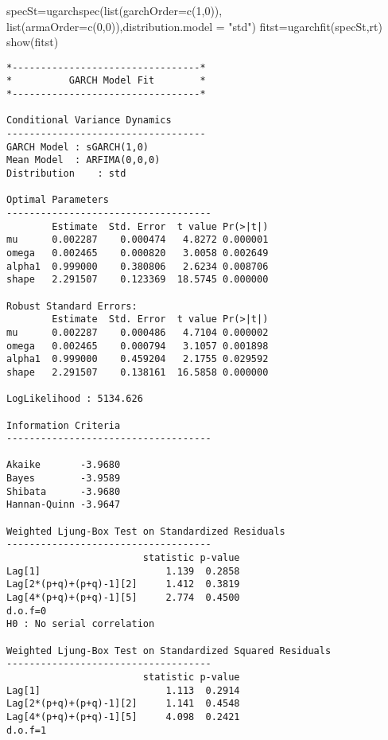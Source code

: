 \documentclass[
  ignorenonframetext,
]{beamer}
\newenvironment{Shaded}{\begin{snugshade}}{\end{snugshade}}
\newcommand{\AttributeTok}[1]{\textcolor[rgb]{0.77,0.63,0.00}{#1}}
\newcommand{\DecValTok}[1]{\textcolor[rgb]{0.00,0.00,0.81}{#1}}
\newcommand{\FunctionTok}[1]{\textcolor[rgb]{0.00,0.00,0.00}{#1}}
\newcommand{\NormalTok}[1]{#1}
\newcommand{\OtherTok}[1]{\textcolor[rgb]{0.56,0.35,0.01}{#1}}
\newcommand{\StringTok}[1]{\textcolor[rgb]{0.31,0.60,0.02}{#1}}
\begin{document}
\begin{frame}[fragile]
\begin{Shaded}
\begin{Highlighting}[]
\NormalTok{specSt}\OtherTok{=}\FunctionTok{ugarchspec}\NormalTok{(}\FunctionTok{list}\NormalTok{(}\AttributeTok{garchOrder=}\FunctionTok{c}\NormalTok{(}\DecValTok{1}\NormalTok{,}\DecValTok{0}\NormalTok{)), }\FunctionTok{list}\NormalTok{(}\AttributeTok{armaOrder=}\FunctionTok{c}\NormalTok{(}\DecValTok{0}\NormalTok{,}\DecValTok{0}\NormalTok{)),}\AttributeTok{distribution.model =} \StringTok{"std"}\NormalTok{)}
\NormalTok{fitst}\OtherTok{=}\FunctionTok{ugarchfit}\NormalTok{(specSt,rt)}
\FunctionTok{show}\NormalTok{(fitst)}
\end{Highlighting}
\end{Shaded}

\begin{verbatim}
*---------------------------------*
*          GARCH Model Fit        *
*---------------------------------*

Conditional Variance Dynamics   
-----------------------------------
GARCH Model : sGARCH(1,0)
Mean Model  : ARFIMA(0,0,0)
Distribution    : std 

Optimal Parameters
------------------------------------
        Estimate  Std. Error  t value Pr(>|t|)
mu      0.002287    0.000474   4.8272 0.000001
omega   0.002465    0.000820   3.0058 0.002649
alpha1  0.999000    0.380806   2.6234 0.008706
shape   2.291507    0.123369  18.5745 0.000000

Robust Standard Errors:
        Estimate  Std. Error  t value Pr(>|t|)
mu      0.002287    0.000486   4.7104 0.000002
omega   0.002465    0.000794   3.1057 0.001898
alpha1  0.999000    0.459204   2.1755 0.029592
shape   2.291507    0.138161  16.5858 0.000000

LogLikelihood : 5134.626 

Information Criteria
------------------------------------
                    
Akaike       -3.9680
Bayes        -3.9589
Shibata      -3.9680
Hannan-Quinn -3.9647

Weighted Ljung-Box Test on Standardized Residuals
------------------------------------
                        statistic p-value
Lag[1]                      1.139  0.2858
Lag[2*(p+q)+(p+q)-1][2]     1.412  0.3819
Lag[4*(p+q)+(p+q)-1][5]     2.774  0.4500
d.o.f=0
H0 : No serial correlation

Weighted Ljung-Box Test on Standardized Squared Residuals
------------------------------------
                        statistic p-value
Lag[1]                      1.113  0.2914
Lag[2*(p+q)+(p+q)-1][2]     1.141  0.4548
Lag[4*(p+q)+(p+q)-1][5]     4.098  0.2421
d.o.f=1


\end{verbatim}
\end{frame}
\end{document}
